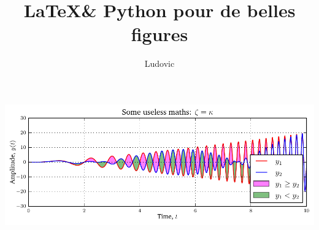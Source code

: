 \documentclass[10pt,a4paper,twoside]{article}
\author{Ludovic}
\title{\LaTeX \& Python pour de belles figures}
\begin{document}
\maketitle

\blindmathpaper

\centerline{\includegraphics{fig}}

\blindmathpaper
\end{document}
